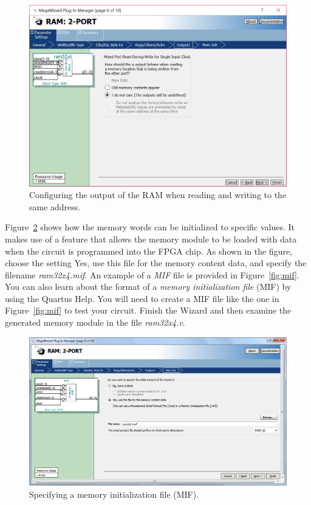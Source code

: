 \documentclass[epsfig,10pt,fullpage]{article}
\begin{document}
\begin{enumerate}
\begin{figure}[H]
	\begin{center}
		\includegraphics[scale=0.50]{figures/figure5.png}
	\end{center}
	\caption{Configuring the output of the RAM when reading and writing to the same address.}
	\label{fig:fig5}
\end{figure}

Figure~\ref{fig:fig6} shows how the memory words can be initialized to specific values. It 
makes use of a feature that allows the memory module to be loaded with data when the circuit is
programmed into the FPGA chip. As shown in the figure, choose the setting {\sf Yes, use this
file for the memory content data}, and specify the filename {\it ram32x4.mif}. An example
of a {\it MIF} file is provided in Figure~\ref{fig:mif}. You can also learn
about the format of a {\it memory initialization file} (MIF) by using the Quartus Help.
You will need to create a MIF file like the one in Figure~\ref{fig:mif} to test your circuit.
Finish the Wizard and then examine the generated memory module in the file {\it ram32x4.v}.

\begin{figure}[H]
	\begin{center}
		\includegraphics[scale=0.50]{figures/figure6.png}
	\end{center}
	\caption{Specifying a memory initialization file (MIF).}
	\label{fig:fig6}
\end{figure}


\end{enumerate}
\end{document}
